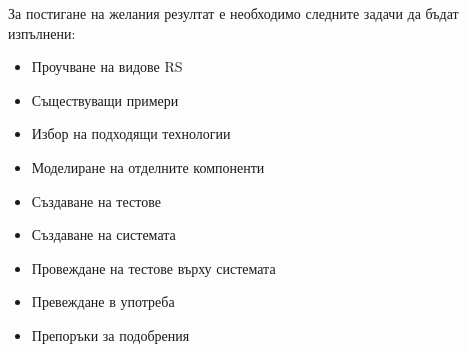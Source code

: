 		За постигане на желания резултат е необходимо следните задачи да бъдат изпълнени:	
	
		\begin{itemize}
			\item Проучване на видове \ac{RS}
			\item Съществуващи примери
			\item Избор на подходящи технологии
			\item Моделиране на отделните компоненти
			\item Създаване на тестове
			\item Създаване на системата
			\item Провеждане на тестове върху системата
			\item Превеждане в употреба
			\item Препоръки за подобрения
		\end{itemize}